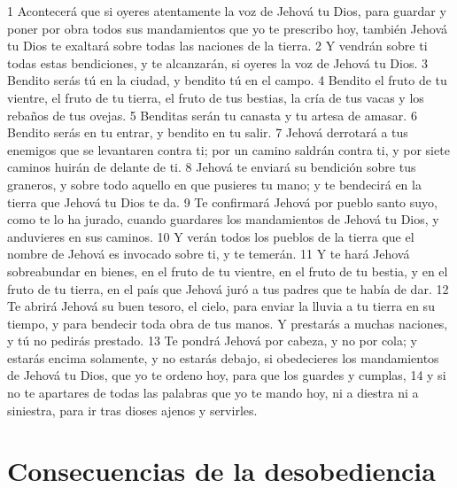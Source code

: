 1 Acontecerá que si oyeres atentamente la voz de Jehová tu Dios, para guardar y poner por obra todos sus mandamientos que yo te prescribo hoy, también Jehová tu Dios te exaltará sobre todas las naciones de la tierra.
2 Y vendrán sobre ti todas estas bendiciones, y te alcanzarán, si oyeres la voz de Jehová tu Dios.
3 Bendito serás tú en la ciudad, y bendito tú en el campo.
4 Bendito el fruto de tu vientre, el fruto de tu tierra, el fruto de tus bestias, la cría de tus vacas y los rebaños de tus ovejas.
5 Benditas serán tu canasta y tu artesa de amasar.
6 Bendito serás en tu entrar, y bendito en tu salir.
7 Jehová derrotará a tus enemigos que se levantaren contra ti; por un camino saldrán contra ti, y por siete caminos huirán de delante de ti.
8 Jehová te enviará su bendición sobre tus graneros, y sobre todo aquello en que pusieres tu mano; y te bendecirá en la tierra que Jehová tu Dios te da.
9 Te confirmará Jehová por pueblo santo suyo, como te lo ha jurado, cuando guardares los mandamientos de Jehová tu Dios, y anduvieres en sus caminos.
10 Y verán todos los pueblos de la tierra que el nombre de Jehová es invocado sobre ti, y te temerán.
11 Y te hará Jehová sobreabundar en bienes, en el fruto de tu vientre, en el fruto de tu bestia, y en el fruto de tu tierra, en el país que Jehová juró a tus padres que te había de dar.
12 Te abrirá Jehová su buen tesoro, el cielo, para enviar la lluvia a tu tierra en su tiempo, y para bendecir toda obra de tus manos. Y prestarás a muchas naciones, y tú no pedirás prestado.
13 Te pondrá Jehová por cabeza, y no por cola; y estarás encima solamente, y no estarás debajo, si obedecieres los mandamientos de Jehová tu Dios, que yo te ordeno hoy, para que los guardes y cumplas,
14 y si no te apartares de todas las palabras que yo te mando hoy, ni a diestra ni a siniestra, para ir tras dioses ajenos y servirles. 

\section{Consecuencias de la desobediencia}


